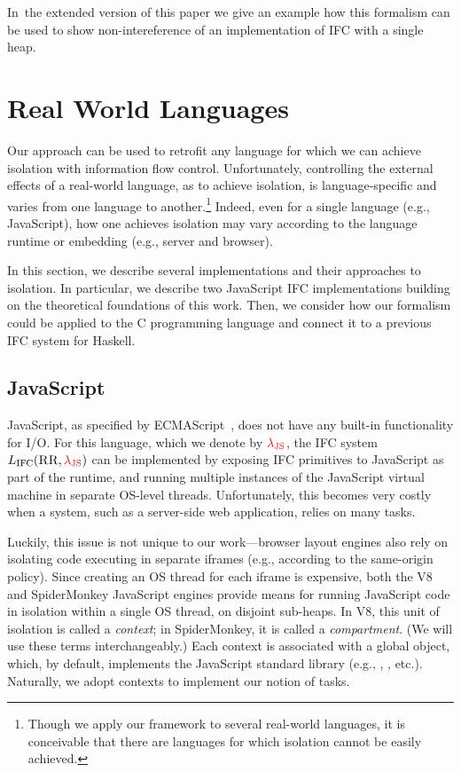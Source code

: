 \documentclass{llncs}
\newif\ifextended
\newcommand{\Red}[1]{{\color{red} #1}}
\newcommand{\appref}[1]{\ifextended Appendix~\ref{#1}\else the extended version of this paper\fi }
\begin{document}
In~\appref{sec:single-heap} we give an example how this formalism can be used
to show non-intereference of an implementation of IFC with a single heap.
\section{Real World Languages}
\label{sec:real}

Our approach can be used to retrofit any language for which we
can achieve isolation with information flow control.
Unfortunately, controlling the external effects of a real-world
language, as to achieve isolation, is language-specific and varies
from one language to another.\footnote{
  Though we apply our framework to several real-world languages, it is
  conceivable that there are languages for which isolation cannot be
  easily achieved.
}
Indeed, even for a single language (e.g., JavaScript), how one
achieves isolation may vary according to the language runtime or
embedding (e.g., server and browser).


In this section, we describe several implementations and their
approaches to isolation.
In particular, we describe two JavaScript IFC implementations
building on the theoretical foundations of this work.
Then, we consider how our formalism could be applied to the C
programming language and connect it to a previous IFC system for
Haskell.







\subsection{JavaScript}
\label{sec:real:js}

JavaScript, as specified by
ECMAScript~\cite{ecma}, does not have any built-in
functionality for I/O.
For this language, which we denote by \ensuremath{\Red{\lambda_{\text{JS}}}}, the IFC system
\ensuremath{L_\text{IFC}(\textsc{RR},\Red{\lambda_{\text{JS}}})} can be implemented by exposing IFC primitives
to JavaScript as part of the runtime, and running multiple instances
of the JavaScript virtual machine in separate OS-level threads.
Unfortunately, this becomes very costly when a system, such as a
server-side web application, relies on many tasks.


Luckily, this issue is not unique to our work---browser layout engines
also rely on isolating code executing in separate iframes (e.g., according to the
same-origin policy).
Since creating an OS thread for each iframe is expensive, both
the V8 and SpiderMonkey JavaScript engines provide means for running
JavaScript code in isolation within a single OS thread,
on disjoint sub-heaps.
In V8, this unit of isolation is called a \emph{context}; in
SpiderMonkey, it is called a \emph{compartment}.
(We will use these terms interchangeably.)
Each context is associated with a global object, which, by
default, implements the JavaScript standard library (e.g.,
, , etc.).
Naturally, we adopt contexts to implement our notion of tasks.
\end{document}

